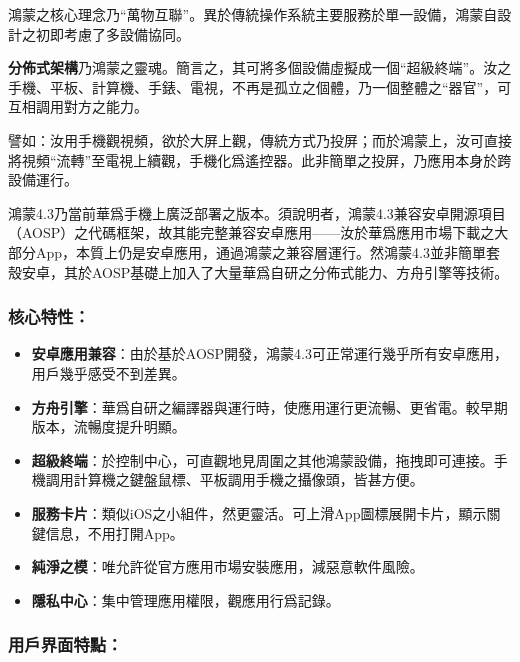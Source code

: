 


鴻蒙之核心理念乃“萬物互聯”。異於傳統操作系統主要服務於單一設備，鴻蒙自設計之初即考慮了多設備協同。

\textbf{分佈式架構}乃鴻蒙之靈魂。簡言之，其可將多個設備虛擬成一個“超級終端”。汝之手機、平板、計算機、手錶、電視，不再是孤立之個體，乃一個整體之“器官”，可互相調用對方之能力。

譬如：汝用手機觀視頻，欲於大屏上觀，傳統方式乃投屏；而於鴻蒙上，汝可直接將視頻“流轉”至電視上續觀，手機化爲遙控器。此非簡單之投屏，乃應用本身於跨設備運行。


鴻蒙4.3乃當前華爲手機上廣泛部署之版本。須說明者，鴻蒙4.3兼容安卓開源項目（AOSP）之代碼框架，故其能完整兼容安卓應用——汝於華爲應用市場下載之大部分App，本質上仍是安卓應用，通過鴻蒙之兼容層運行。然鴻蒙4.3並非簡單套殼安卓，其於AOSP基礎上加入了大量華爲自研之分佈式能力、方舟引擎等技術。

\subsubsection*{核心特性：}

\begin{itemize}
  \item \textbf{安卓應用兼容}：由於基於AOSP開發，鴻蒙4.3可正常運行幾乎所有安卓應用，用戶幾乎感受不到差異。
  \item \textbf{方舟引擎}：華爲自研之編譯器與運行時，使應用運行更流暢、更省電。較早期版本，流暢度提升明顯。
  \item \textbf{超級終端}：於控制中心，可直觀地見周圍之其他鴻蒙設備，拖拽即可連接。手機調用計算機之鍵盤鼠標、平板調用手機之攝像頭，皆甚方便。
  \item \textbf{服務卡片}：類似iOS之小組件，然更靈活。可上滑App圖標展開卡片，顯示關鍵信息，不用打開App。
  \item \textbf{純淨之模}：唯允許從官方應用市場安裝應用，減惡意軟件風險。
  \item \textbf{隱私中心}：集中管理應用權限，觀應用行爲記錄。
\end{itemize}

\subsubsection*{用戶界面特點：}

